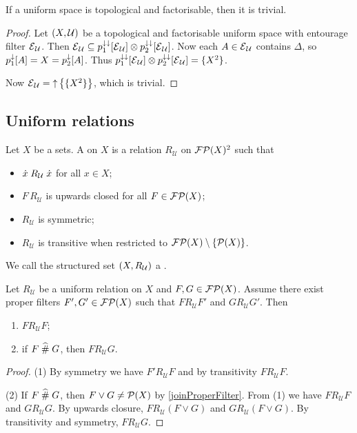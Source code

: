 \begin{proposition}
If a uniform space is topological and factorisable, then it is trivial.
\end{proposition}
\begin{proof}
Let $\left( X,\mathcal{U} \right)$ be a topological and factorisable uniform space with entourage filter $\operatorname{\mathcal{E}}_\mathcal{U}$. Then $\operatorname{\mathcal{E}}_\mathcal{U} \subseteq p_1^{\downarrow\downarrow}[\operatorname{\mathcal{E}}_\mathcal{U}]\otimes p_2^{\downarrow\downarrow}[\operatorname{\mathcal{E}}_\mathcal{U}]$. Now each $A\in \operatorname{\mathcal{E}}_\mathcal{U}$ contains $\Delta$, so $p_1^\downarrow[A] = X = p_2^\downarrow[A]$. Thus $p_1^{\downarrow\downarrow}[\operatorname{\mathcal{E}}_\mathcal{U}]\otimes p_2^{\downarrow\downarrow}[\operatorname{\mathcal{E}}_\mathcal{U}] = \{X^2\}$.

Now $\operatorname{\mathcal{E}}_\mathcal{U} = \operatorname{\uparrow}\big\{\{X^2\}\big\}$, which is trivial.
\end{proof}

\subsection{Uniform relations}
\begin{definition}
Let $X$ be a sets. A  on $X$ is a relation $R_\mathcal{U}$ on $\operatorname{\mathcal{FP}}(X)^2$ such that
\begin{itemize}
\item $\dot{x}\mathrel{R_\mathcal{U}}\dot{x}$ for all $x\in X$;
\item $F\,R_\mathcal{U}$ is upwards closed for all $F\in \operatorname{\mathcal{FP}}(X)$;
\item $R_\mathcal{U}$ is symmetric;
\item $R_\mathcal{U}$ is transitive when restricted to $\operatorname{\mathcal{FP}}(X)\setminus\{\operatorname{\mathcal{P}}(X)\}$.
\end{itemize}
We call the structured set $\left( X,R_\mathcal{U} \right)$ a .
\end{definition}

\begin{lemma} \label{uniformRelationRelatedElementLemma}
Let $R_\mathcal{U}$ be a uniform relation on $X$ and $F,G\in\operatorname{\mathcal{FP}}(X)$. Assume there exist proper filters $F',G'\in\operatorname{\mathcal{FP}}(X)$ such that $F\mathrel{R_\mathcal{U}} F'$ and $G\mathrel{R_\mathcal{U}}G'$. Then
\begin{enumerate}
\item $F\mathrel{R_\mathcal{U}} F$;
\item if $F\mathrel{\widehat{\#}} G$, then $F\mathrel{R_\mathcal{U}} G$.
\end{enumerate}
\end{lemma}
\begin{proof}
(1) By symmetry we have $F'\mathrel{R_\mathcal{U}} F$ and by transitivity $F\mathrel{R_\mathcal{U}} F$.

(2) If $F\mathrel{\widehat{\#}} G$, then $F\vee G \neq \operatorname{\mathcal{P}}(X)$ by \ref{joinProperFilter}. From (1) we have $F\mathrel{R_\mathcal{U}} F$ and $G\mathrel{R_\mathcal{U}} G$. By upwards closure, $F\mathrel{R_\mathcal{U}} (F\vee G)$ and $G\mathrel{R_\mathcal{U}} (F\vee G)$. By transitivity and symmetry, $F\mathrel{R_\mathcal{U}} G$.
\end{proof}

